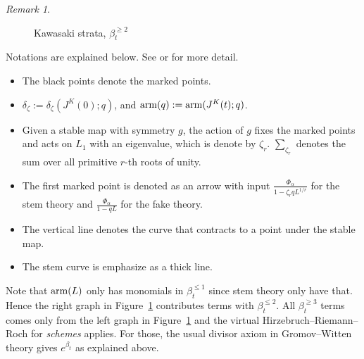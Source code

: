 \documentclass[11pt]{amsart}
\newtheorem*{main theorem*}{Main Theorem}
\theoremstyle{remark}
\newtheorem{remark}[theorem]{Remark}
\numberwithin{equation}{section}
\newcommand{\arm}{{\rm arm}}
\begin{document}
\begin{remark}
    \begin{figure}[ht]
    \centering
    \caption{Kawasaki strata, $\beta_t^{\geq 2}$}
    \label{Graph_Kawasaki_Strata_beta2}
    \end{figure}

Notations are explained below. See \cite{Chou_Lee_2022_QKGVI} or \cite{Givental_Tonita_2011} for more detail. 
\begin{itemize}
    \item The black points denote the marked points.
    \item $\delta_{\zeta}:= \delta_{\zeta}(J^K(0);q)$, and $\arm(q):= \arm(J^K(t);q)$.
    \item Given a stable map with symmetry $g$, the action of $g$ fixes the marked points and acts on $L_1$ with an eigenvalue, which is denote by $\zeta_r$. $\displaystyle \sum_{\zeta_r}$ denotes the sum over all primitive $r$-th roots of unity.
    \item The first marked point is denoted as an arrow with input $ \frac{\Phi_{\alpha}}{1-\zeta_r q L^{1/r}}$ for the stem theory and $\frac{\Phi_{\alpha}}{1-qL}$ for the fake theory.
    \item The vertical line denotes the curve that contracts to a point under the stable map. 
    \item The stem curve is emphasize as a thick line.
\end{itemize}
Note that $\arm(L)$ only has monomials in $\beta_t^{\leq 1}$ since stem theory only have that.  Hence the right graph in Figure~\ref{Graph_Kawasaki_Strata_beta2} contributes terms with $\beta_t^{\leq 2}$. All $\beta_t^{\geq 3}$ terms comes only from the left graph in Figure~\ref{Graph_Kawasaki_Strata_beta2} and the virtual Hirzebruch--Riemann--Roch for \emph{schemes} applies. For those, the usual divisor axiom in Gromov--Witten theory gives $e^{\beta_t}$ as explained above.
\end{remark}
\end{document}
